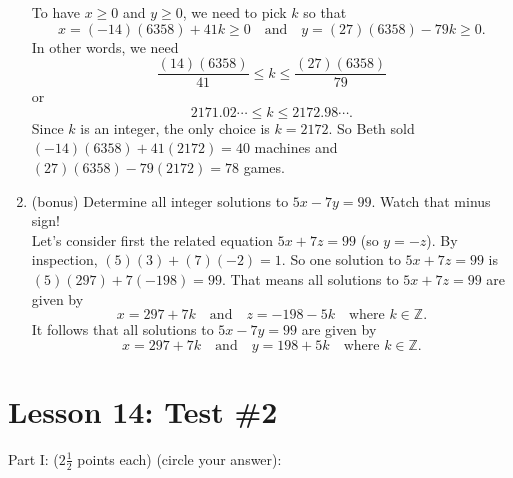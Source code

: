 \documentclass[11pt]{amsart}
\begin{document}
\begin{enumerate}
{To have $x\geq 0$ and $y\geq 0$, we need to pick $k$ so that
\[
x = (-14)(6358)+41k\geq 0 \quad \text{and}\quad y = (27)(6358) - 79k\geq 0. 
\]
In other words, we need 
\[
\frac{(14)(6358)}{41}\leq k \leq \frac{(27)(6358)}{79}
\]
or
\[
2171.02\cdots \leq k \leq 2172.98\cdots.
\]
Since $k$ is an integer, the only choice is $k = 2172$.
So Beth sold $(-14)(6358)+41(2172) = 40$ machines and $(27)(6358)-79(2172) = 78$ games.\\[5pt]
}


\item (bonus) Determine all integer solutions to $5x - 7y = 99$. Watch that minus sign!\\[3pt]

{\color{blue}
Let's consider first the related equation $5x+7z = 99$ (so $y = -z$).
By inspection,  $(5)(3) + (7)(-2) = 1$. So one solution to  $5x+7z = 99$
is $(5)(297) + 7(-198) = 99$. That means all solutions to $5x+7z = 99$
are given by
\[
x= 297 + 7k \quad \text{and} \quad z = -198 - 5k \quad \text{where } k\in{\mathbb{Z}}.
\]
It follows that all solutions to $5x - 7y = 99$ are given by
\[
x= 297 + 7k \quad \text{and} \quad y = 198 + 5k \quad \text{where } k\in{\mathbb{Z}}.
\]
}

\end{enumerate}

\vfill\break

\section{Lesson 14: Test \#2}

\vskip 10pt
\begin{center}
Part I:  ($2\frac{1}{2}$ points each)  (circle your answer): 
\end{center}
\vskip 10pt
\end{document}
